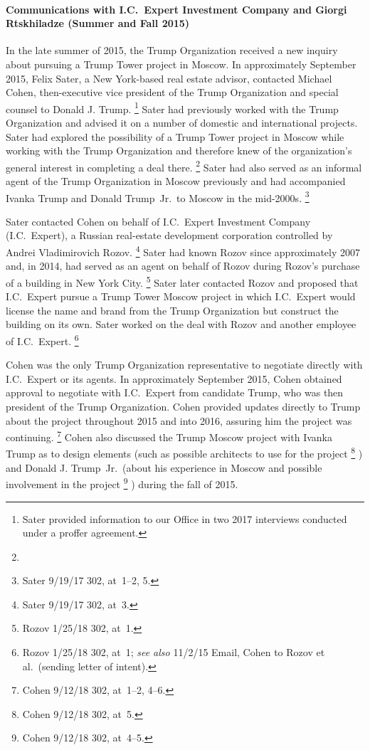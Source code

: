 \paragraph{Communications with I.C.~Expert Investment Company and Giorgi Rtskhiladze (Summer and Fall 2015)}

In the late summer of 2015, the Trump Organization received a new inquiry about pursuing a Trump Tower project in Moscow.
In approximately September 2015, Felix Sater, a New York-based real estate advisor, contacted Michael Cohen, then-executive vice president of the Trump Organization and special counsel to Donald J. Trump.%
\footnote{Sater provided information to our Office in two 2017 interviews conducted under a proffer agreement.
}
Sater had previously worked with the Trump Organization and advised it on a number of domestic and international projects.
Sater had explored the possibility of a Trump Tower project in Moscow while working with the Trump Organization and therefore knew of the organization's general interest in completing a deal there.%
\footnote{}
Sater had also served as an informal agent of the Trump Organization in Moscow previously and had accompanied Ivanka Trump and Donald Trump~Jr.\ to Moscow in the mid-2000s.%
\footnote{Sater 9/19/17 302, at~1--2, 5.}

Sater contacted Cohen on behalf of I.C.~Expert Investment Company (I.C.~Expert), a Russian real-estate development corporation controlled by Andrei Vladimirovich Rozov.%
\footnote{Sater 9/19/17 302, at~3.}
Sater had known Rozov since approximately 2007 and, in 2014, had served as an agent on behalf of Rozov during Rozov's purchase of a building in New York City.%
\footnote{Rozov 1/25/18 302, at~1.}
Sater later contacted Rozov and proposed that I.C.~Expert pursue a Trump Tower Moscow project in which I.C.~Expert would license the name and brand from the Trump Organization but construct the building on its own.
Sater worked on the deal with Rozov and another employee of I.C.~Expert.%
\footnote{Rozov 1/25/18 302, at~1;
\textit{see also} 11/2/15 Email, Cohen to Rozov et al.\ (sending letter of intent).}

Cohen was the only Trump Organization representative to negotiate directly with I.C.~Expert or its agents.
In approximately September 2015, Cohen obtained approval to negotiate with I.C.~Expert from candidate Trump, who was then president of the Trump Organization.
Cohen provided updates directly to Trump about the project throughout 2015 and into 2016, assuring him the project was continuing.%
\footnote{Cohen 9/12/18 302, at~1--2, 4--6.}
Cohen also discussed the Trump Moscow project with Ivanka Trump as to design elements (such as possible architects to use for the project%
\footnote{Cohen 9/12/18 302, at~5.}%
) and Donald J. Trump~Jr.\ (about his experience in Moscow and possible involvement in the project%
\footnote{Cohen 9/12/18 302, at~4--5.}%
) during the fall of 2015.

